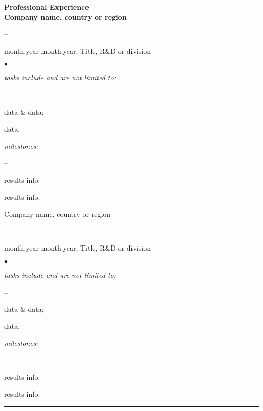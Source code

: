 \documentclass[oneside,final,10pt]{extreport}
\newenvironment{compactlist}{
	\begin{list}{{$\bullet$}}{
		\setlength\leftmargin{0.4cm}
		\setlength\partopsep{0pt}
		\setlength\parskip{0pt}
		\setlength\parsep{0pt}
		\setlength\topsep{0pt}
		\setlength\itemsep{0pt}
	}
}{
	\end{list}
}
\newenvironment{innerlist}{
	\begin{list}{--}{
		\setlength\leftmargin{0.8cm}
		\setlength\partopsep{0pt}
		\setlength\parskip{0pt}
		\setlength\parsep{0pt}
		\setlength\topsep{0pt}
		\setlength\itemsep{0pt}
	}
}{
	\end{list}
}
\begin{document}
\bfseries
Professional Experience \\
\mdseries
Company name, country or region
\mdseries
	\begin{innerlist}
		\bfseries
		\item month.year-month.year, Title, R\&D or division
		\mdseries
			\begin{compactlist}
				\item \textsl{tasks include and are not limited to:}
					\begin{innerlist}
						\item data \& data;
						\item data. 
					\end{innerlist}
				\item \textsl{milestones:}
					\begin{innerlist}
						\item results info.
						\item results info.\\[1pt]
					\end{innerlist}
			\end{compactlist}
	\end{innerlist}

Company name, country or region
\mdseries
	\begin{innerlist}
		\bfseries
		\item month.year-month.year, Title, R\&D or division
		\mdseries
			\begin{compactlist}
				\item \textsl{tasks include and are not limited to:}
					\begin{innerlist}
						\item data \& data;
						\item data.
					\end{innerlist}
				\item \textsl{milestones:}
					\begin{innerlist}
						\item results info.
						\item results info.\\[1pt]
					\end{innerlist}
			\end{compactlist}
	\end{innerlist}
\rule{\textwidth}{0.4pt}
\end{document}
